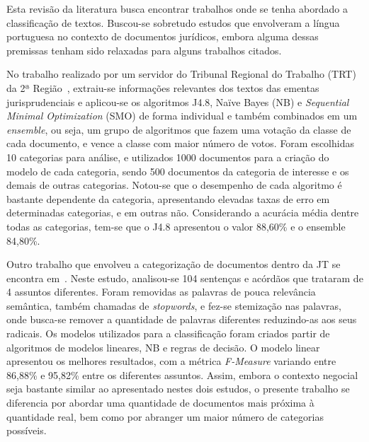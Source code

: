 \label{cap:TrabalhosRelacionados}%
\newcommand{\texCommand}[1]{\texttt{\textbackslash{#1}}}%

\newcommand{\exemplo}[1]{%
\vspace{\baselineskip}%
\noindent\fbox{\begin{minipage}{\textwidth}#1\end{minipage}}%
\\\vspace{\baselineskip}}%

\newcommand{\exemploVerbatim}[1]{%
\vspace{\baselineskip}%
\noindent\fbox{\begin{minipage}{\textwidth}%
#1\end{minipage}}%
\\\vspace{\baselineskip}}%

Esta revisão da literatura busca encontrar trabalhos onde se tenha abordado a classificação de textos. Buscou-se sobretudo estudos que envolveram a língua portuguesa no contexto de documentos jurídicos, embora alguma dessas premissas tenham sido relaxadas para alguns trabalhos citados.


No trabalho realizado por um servidor do Tribunal Regional do Trabalho (TRT) da 2ª Região~\cite{ferauche}, extraiu-se informações relevantes dos textos das ementas jurisprudenciais e aplicou-se os algoritmos J4.8, Naïve Bayes (NB) e \textit{Sequential Minimal Optimization }(SMO) de forma individual e também combinados em um \textit{ensemble}, ou seja, um grupo de algoritmos que fazem uma votação da classe de cada documento, e vence a classe com maior número de votos. Foram escolhidas 10 categorias para análise, e utilizados 1000 documentos para a criação do modelo de cada categoria, sendo 500 documentos da categoria de interesse e os demais de outras categorias. Notou-se que o desempenho de cada algoritmo é bastante dependente da categoria, apresentando elevadas taxas de erro em determinadas categorias, e em outras não. Considerando a acurácia média dentre todas as categorias, tem-se que o J4.8 apresentou o valor 88,60\% e o ensemble 84,80\%. 

Outro trabalho que envolveu a categorização de documentos dentro da JT se encontra em~\cite{ticom_aplicacao_2007}. Neste estudo, analisou-se 104 sentenças e acórdãos que trataram de 4 assuntos diferentes. Foram removidas as palavras de pouca relevância semântica, também chamadas de \textit{stopwords}, e fez-se stemização nas palavras, onde busca-se remover a quantidade de palavras diferentes reduzindo-as aos seus radicais. Os modelos utilizados para a classificação foram criados partir de algoritmos de modelos lineares, NB e regras de decisão. O modelo linear apresentou os melhores resultados, com a métrica \textit{F-Measure} variando  entre 86,88\% e 95,82\% entre os diferentes assuntos. Assim, embora o contexto negocial seja bastante similar ao apresentado nestes dois estudos, o presente trabalho se diferencia por abordar uma quantidade de documentos mais próxima à quantidade real, bem como por abranger um maior número de categorias possíveis.



